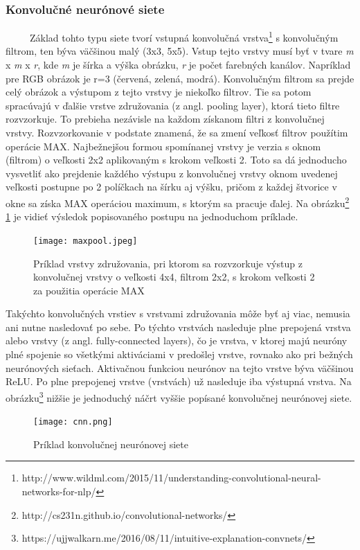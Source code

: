 \subsubsection{Konvolučné neurónové siete}
\
\
\
\
\
Základ tohto typu siete tvorí vstupná konvolučná vrstva\footnote{http://www.wildml.com/2015/11/understanding-convolutional-neural-networks-for-nlp/} s konvolučným filtrom, ten býva väčšinou malý (3x3, 5x5). Vstup tejto vrstvy musí byť v tvare \textit{m} x \textit{m} x \textit{r}, kde \textit{m} je šírka a výška obrázku, \textit{r} je počet farebných kanálov. Napríklad pre RGB obrázok je r=3 (červená, zelená, modrá). Konvolučným filtrom sa prejde celý obrázok a výstupom z tejto vrstvy je niekoľko filtrov. Tie sa potom spracúvajú v ďalšie vrstve združovania (z angl. pooling layer\cite{cs231n}), ktorá tieto filtre rozvzorkuje. To prebieha nezávisle na každom získanom filtri z konvolučnej vrstvy. Rozvzorkovanie v podstate znamená, že sa zmení veľkosť filtrov použítim operácie MAX. Najbežnejšou formou spomínanej vrstvy je verzia s oknom (filtrom) o veľkosti 2x2 aplikovaným s krokom veľkosti 2. Toto sa dá jednoducho vysvetliť ako prejdenie každého výstupu z konvolučnej vrstvy oknom uvedenej veľkosti postupne po 2 políčkach na šírku aj výšku, pričom z každej štvorice v okne sa získa MAX operáciou maximum, s ktorým sa pracuje ďalej. Na  obrázku\footnote{http://cs231n.github.io/convolutional-networks/} \ref{fig:cnn} je vidieť výsledok popisovaného postupu na jednoduchom príklade.
	
	\begin{figure}[H]
		\begin{center}\texttt{[image: maxpool.jpeg]}\end{center}
		\caption[Vrstva združovania - príklad vzorkovania]{Príklad vrstvy združovania, pri ktorom sa rozvzorkuje výstup z konvolučnej vrstvy o veľkosti 4x4, filtrom 2x2, s krokom veľkosti 2 za použitia operácie MAX}\label{fig:cnn}
	\end{figure}
	Takýchto konvolučných vrstiev s vrstvami združovania môže byť aj viac, nemusia ani nutne nasledovať po sebe. Po týchto vrstvách nasleduje plne prepojená vrstva alebo vrstvy (z angl. fully-connected layers), čo je vrstva, v ktorej majú neuróny plné spojenie so všetkými aktiváciami v predošlej vrstve, rovnako ako pri bežných neurónových sieťach. Aktivačnou funkciou neurónov na tejto vrstve býva väčšinou ReLU. Po plne prepojenej vrstve (vrstvách) už nasleduje iba výstupná vrstva. Na obrázku\footnote{https://ujjwalkarn.me/2016/08/11/intuitive-explanation-convnets/} nižšie je jednoduchý náčrt vyššie popísané konvolučnej neurónovej siete. 
	\begin{figure}[H]
		\begin{center}\texttt{[image: cnn.png]}\end{center}
		\caption[Konvolučná neurónová sieť]{Príklad konvolučnej neurónovej siete}\label{conv_nn}
	\end{figure}
	
